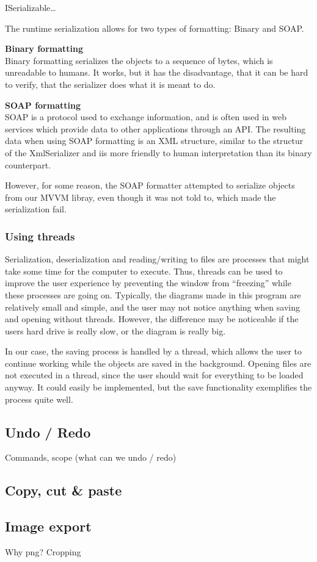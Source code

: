 ISerializable…

The runtime serialization allows for two types of formatting: Binary and SOAP.

\textbf{Binary formatting}\\
Binary formatting serializes the objects to a sequence of bytes, which is unreadable to humans. It works, but it has the disadvantage, that it can be hard to verify, that the serializer does what it is meant to do.

\textbf{SOAP formatting}\\
SOAP is a protocol used to exchange information, and is often used in web services which provide data to other applications through an API. The resulting data when using SOAP formatting is an XML structure, similar to the structur of the XmlSerializer and iis more friendly to human interpretation than its binary counterpart.

However, for some reason, the SOAP formatter attempted to serialize objects from our MVVM libray, even though it was not told to, which made the serialization fail.

\subsubsection{Using threads}
Serialization, deserialization and reading/writing to files are processes that might take some time for the computer to execute. Thus, threads can be used to improve the user experience by preventing the window from “freezing” while these processes are going on. Typically, the diagrams made in this program are relatively small and simple, and the user may not notice anything when saving and opening without threads. However, the difference may be noticeable if the users hard drive is really slow, or the diagram is really big.

In our case, the saving process is handled by a thread, which allows the user to continue working while the objects are saved in the background. Opening files are not executed in a thread, since the user should wait for everything to be loaded anyway. It could easily be implemented, but the save functionality exemplifies the process quite well.


\subsection{Undo / Redo}
Commands, scope (what can we undo / redo)

\subsection{Copy, cut \& paste}

\subsection{Image export}
Why png? Cropping
